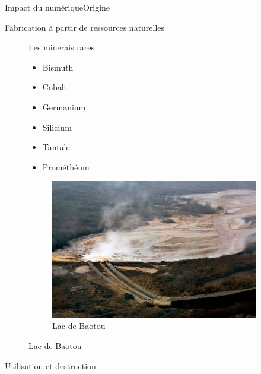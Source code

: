 
\begin{frame}{Impact du numérique}{Origine}

\begin{block}{Fabrication à partir de ressources naturelles}
\begin{figure}[h!]

\begin{minipage}[b]{0.5\linewidth}
Les minerais rares
\begin{itemize}
    \item Bismuth
    \item Cobalt
    \item Germanium
    \item Silicium
    \item Tantale
    \item Prométhéum
\end{itemize}

\end{minipage}\hfill
\begin{minipage}[b]{0.45\linewidth}  
\begin{figure}
    \centering
    \includegraphics[scale=0.17]{Feathergraphics/lac.jpg}
    \caption{Lac de Baotou}
\end{figure}
\end{minipage}\hfill


\end{figure}

\end{block}
\begin{block}{Utilisation et destruction }
    

\end{block}
\end{frame}
